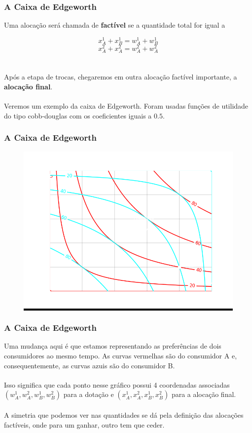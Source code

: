 \documentclass{beamer}[10]
\begin{document}
\begin{frame}
	\frametitle{A Caixa de Edgeworth}

	Uma alocação será chamada de \textbf{factível} se a quantidade total for igual a 

	$$x_A^1 + x_B^1 = w_A^1 + w_B^1$$
	$$x_A^2 + x_A^2 = w_A^2 + w_A^2$$
	\\~\\
	Após a etapa de trocas, chegaremos em outra alocação factível importante, a \textbf{alocação final}.
	\\~\\
	Veremos um exemplo da caixa de Edgeworth. Foram usadas funções de utilidade do tipo cobb-douglas com os coeficientes iguais a $0.5$.

\end{frame}

\begin{frame}
	\frametitle{A Caixa de Edgeworth}

	\begin{figure}[H]
		\centering
		\colorbox{black}{\includegraphics[scale=0.6]{cap32_1-caixa_edgeworth_1.png}}
	\end{figure}

\end{frame}

\begin{frame}
	\frametitle{A Caixa de Edgeworth}

	Uma mudança aqui é que estamos representando as preferências de dois consumidores ao mesmo tempo. As curvas vermelhas são do consumidor A e, consequentemente, as curvas azuis são do consumidor B.
	\\~\\
	Isso significa que cada ponto nesse gráfico possui 4 coordenadas associadas $(w_A^1, w_A^2, w_B^1, w_B^2)$ para a dotação e $(x_A^1, x_A^2, x_B^1, x_B^2)$ para a alocação final. 
	\\~\\
	A simetria que podemos ver nas quantidades se dá pela definição das alocações factíveis, onde para um ganhar, outro tem que ceder.

\end{frame}
\end{document}

